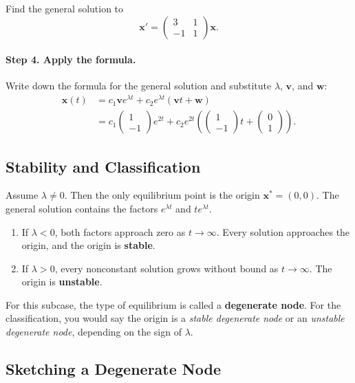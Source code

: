 \documentclass[11pt,letterpaper]{article}
\begin{document}
\begin{example}[4]{
Find the general solution to 
\[
\mathbf{x}' = \begin{pmatrix}3&1\\-1&1\end{pmatrix}\mathbf{x}.
\]
}
\paragraph{Step 4. Apply the formula.} Write down the formula for the general solution and substitute $\lambda$, $\textbf{v}$, and $\textbf{w}$:
\begin{align*}
    \mathbf{x}(t)&=c_1\mathbf{v}e^{\lambda t}+c_2e^{\lambda t}(\mathbf{v}t+\mathbf{w})\\
    &=\boxed{c_1\begin{pmatrix}
        1\\-1
    \end{pmatrix}e^{2 t}+c_2e^{2 t}\left(\begin{pmatrix}
        1\\-1
    \end{pmatrix}t+\begin{pmatrix}
        0\\1
    \end{pmatrix}\right).}
\end{align*}
\end{example}



\subsection{Stability and Classification}
Assume $\lambda\ne0$. Then the only equilibrium point is the origin $\mathbf{x}^*=(0,0)$. The general solution contains the factors $e^{\lambda t}$ and $te^{\lambda t}$.
\begin{enumerate}
    \item If $\lambda<0$, both factors approach zero as $t\to\infty$. Every solution approaches the origin, and the origin is \textbf{stable}.
    \item If $\lambda>0$, every nonconstant solution grows without bound as $t\to\infty$. The origin is \textbf{unstable}.
\end{enumerate}
For this subcase, the type of equilibrium is called a \textbf{degenerate node}. For the classification, you would say the origin is a \textit{stable degenerate node} or an \textit{unstable degenerate node}, depending on the sign of $\lambda$.


\subsection{Sketching a Degenerate Node}
\end{document}
